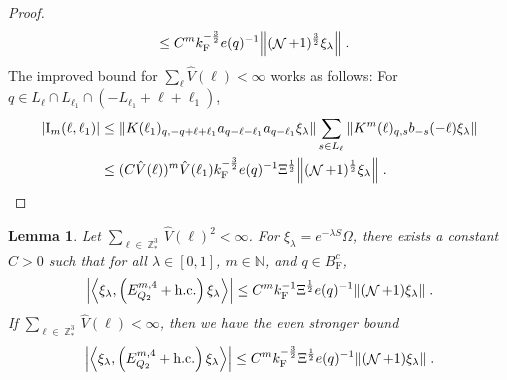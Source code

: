 \documentclass[12pt,a4paper]{article}
\numberwithin{equation}{section}
\newcommand{\NNN}{\mathbb{N}}
\newcommand{\1}{\mathbb{I}}
\newcommand{\F}{\mathrm{F}}
\newcommand{\I}{\mathrm{I}}
\DeclareMathOperator{\Z}{\mathbb{Z}}
\DeclareMathOperator{\NN}{\mathcal{N}}
\newcommand{\half}{\frac{1}{2}}
\newcommand{\eva}[1]{\left\langle #1 \right\rangle}
\theoremstyle{plain}
\newtheorem{lemma}[theorem]{Lemma}
\theoremstyle{definition}
\theoremstyle{remark}
\theoremstyle{plain}
\theoremstyle{definition}
\theoremstyle{remark}
\begin{document}
\begin{proof}
{\begin{align}
	&\leq C^m k_{\F}^{-\frac 32} e(q)^{-1}
		\norm{(\NN+1)^{\frac 32} \xi_\lambda} \;. \label{eq:estEQ2153_Coulomb}
\end{align}
The improved bound for $ \sum_\ell \hat{V}(\ell) < \infty $ works as follows: For $ q \in L_\ell \cap L_{\ell_1} \cap (-L_{\ell_1} + \ell + \ell_1) $,}
\begin{align}
	|\I_m(\ell, \ell_1)|
	&\leq \norm{K(\ell_1)_{q,-q+\ell+\ell_1} a_{q-\ell-\ell_1} a_{q-\ell_1} \xi_\lambda}
		\sum\limits_{ s \in L_{\ell}}
		\norm{ K^m(\ell)_{q,s} b_{-s}(-\ell) \xi_\lambda }\nonumber\\
	&\leq (C \hat{V}(\ell))^m
		\hat{V}(\ell_1)
		k_{\F}^{-\frac 32} e(q)^{-1} \Xi^\half
		\norm{(\NN+1)^\half\xi_\lambda} \;. \label{eq:estEQ2153}
\end{align}
\end{proof}


\begin{lemma} \label{lem:EQ217}
Let $ \sum_{\ell \in \Z^3_*} \hat{V}(\ell)^2 < \infty $. For $\xi_\lambda = e^{-\lambda S} \Omega$, there exists a constant $ C > 0 $ such that for all $ \lambda \in [0,1] $, $ m \in \NNN $, and $ q \in B_{\F}^c $,
\begin{align}
	\abs{\eva{\xi_\lambda,\left(E^{m,4}_{Q_2}+\mathrm{h.c.}\right) \xi_\lambda }}
	\leq C^m k_{\F}^{-1} \Xi^{\half}  e(q)^{-1} 
		\norm{(\NN+1) \xi_\lambda } \;. \label{eq:estEQ217_Coulomb}
\end{align}
If $ \sum_{\ell \in \Z^3_*} \hat{V}(\ell) < \infty $, then we have the even stronger bound
\begin{align}
	\abs{\eva{\xi_\lambda,\left(E^{m,4}_{Q_2}+\mathrm{h.c.}\right) \xi_\lambda }}
	\leq C^m k_{\F}^{-\frac 32} \Xi^{\half}  e(q)^{-1} 
		\norm{(\NN+1) \xi_\lambda } \;. \label{eq:estEQ217}
\end{align}
\end{lemma}
\end{document}
